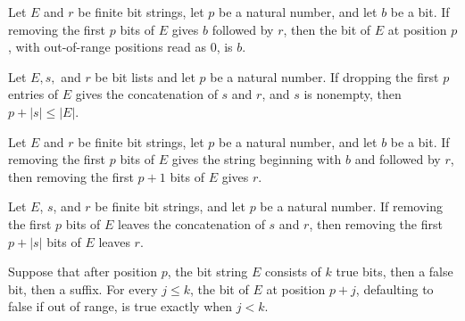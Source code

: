\begin{lemma}
\label{BoolCircuit.AdjScan.getD_of_drop}
\leanok
{}
Let $E$ and $r$ be finite bit strings, let $p$ be a natural number, and let $b$ be a
bit. If removing the first $p$ bits of $E$ gives $b$ followed by $r$, then the bit of
$E$ at position $p$, with out-of-range positions read as $0$, is $b$.
\end{lemma}

\begin{lemma}
\label{BoolCircuit.AdjScan.le_of_drop}
\leanok
{}
Let $E,s,$ and $r$ be bit lists and let $p$ be a natural number. If dropping the first
$p$ entries of $E$ gives the concatenation of $s$ and $r$, and $s$ is nonempty, then
$p+|s|\le |E|$.
\end{lemma}

\begin{lemma}
\label{BoolCircuit.AdjScan.drop_succ_of_drop}
\leanok
{}
Let $E$ and $r$ be finite bit strings, let $p$ be a natural number, and let $b$ be a
bit. If removing the first $p$ bits of $E$ gives the string beginning with $b$ and
followed by $r$, then removing the first $p+1$ bits of $E$ gives $r$.
\end{lemma}

\begin{lemma}
\label{BoolCircuit.AdjScan.drop_add_of_drop}
\leanok
{}
Let $E$, $s$, and $r$ be finite bit strings, and let $p$ be a natural number. If
removing the first $p$ bits of $E$ leaves the concatenation of $s$ and $r$, then
removing the first $p+|s|$ bits of $E$ leaves $r$.
\end{lemma}

\begin{lemma}
\label{BoolCircuit.AdjScan.bit_rep}
\leanok
{}
Suppose that after position $p$, the bit string $E$ consists of $k$ true bits, then a
false bit, then a suffix. For every $j\le k$, the bit of $E$ at position $p+j$,
defaulting to false if out of range, is true exactly when $j<k$.
\end{lemma}

